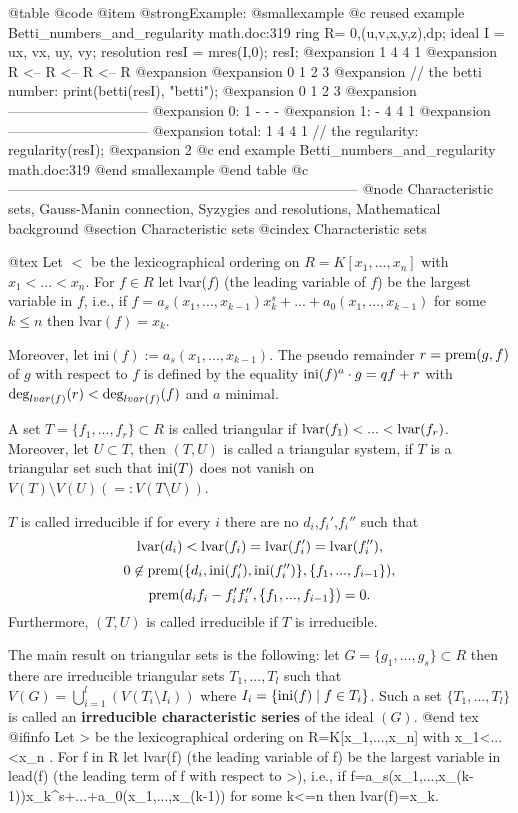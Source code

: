 @table @code
@item @strong{Example:}
@smallexample
@c reused example Betti_numbers_and_regularity math.doc:319 
  ring R= 0,(u,v,x,y,z),dp;
  ideal I = ux, vx, uy, vy;
  resolution resI = mres(I,0); resI;
@expansion{}  1      4      4      1      
@expansion{} R <--  R <--  R <--  R
@expansion{} 
@expansion{} 0      1      2      3      
@expansion{} 
  // the betti number:
  print(betti(resI), "betti");
@expansion{}            0     1     2     3
@expansion{} ------------------------------
@expansion{}     0:     1     -     -     -
@expansion{}     1:     -     4     4     1
@expansion{} ------------------------------
@expansion{} total:     1     4     4     1
  // the regularity:
  regularity(resI);
@expansion{} 2
@c end example Betti_numbers_and_regularity math.doc:319
@end smallexample
@end table
@c ---------------------------------------------------------------------------
@node Characteristic sets, Gauss-Manin connection, Syzygies and resolutions, Mathematical background
@section Characteristic sets
@cindex Characteristic sets

@tex
Let $<$ be the lexicographical ordering on $R=K[x_1,...,x_n]$ with $x_1
< ... < x_n$.
For $f \in R$ let lvar($f$) (the leading variable of $f$) be the largest
variable in $f$,
i.e., if $f=a_s(x_1,...,x_{k-1})x_k^s+...+a_0(x_1,...,x_{k-1})$ for some
$k \leq n$ then lvar$(f)=x_k$.

Moreover, let
\hbox{ini}$(f):=a_s(x_1,...,x_{k-1})$. The pseudo remainder
$r=\hbox{prem}(g,f)$ of $g$ with respect to $f$ is
defined by the equality $\hbox{ini}(f)^a\cdot g = qf+r$ with
$\hbox{deg}_{lvar(f)}(r)<\hbox{deg}_{lvar(f)}(f)$ and $a$
minimal.

A set $T=\{f_1,...,f_r\} \subset R$ is called triangular if
$\hbox{lvar}(f_1)<...<\hbox{lvar}(f_r)$. Moreover, let $ U \subset T $,
then $(T,U)$ is called a triangular system, if $T$ is a triangular set
such that $\hbox{ini}(T)$ does not vanish on $V(T) \setminus V(U)
(=:V(T\setminus U))$.

$T$ is called irreducible if for every $i$ there are no
$d_i$,$f_i'$,$f_i''$ such that
$$   \hbox{lvar}(d_i)<\hbox{lvar}(f_i) =
\hbox{lvar}(f_i')=\hbox{lvar}(f_i''),$$
$$   0 \not\in \hbox{prem}(\{ d_i, \hbox{ini}(f_i'),
\hbox{ini}(f_i'')\},\{ f_1,...,f_{i-1}\}),$$
$$\hbox{prem}(d_if_i-f_i'f_i'',\{f_1,...,f_{i-1}\})=0.$$
Furthermore, $(T,U)$ is called irreducible if $T$ is irreducible.

The main result on triangular sets is the following:
let $G=\{g_1,...,g_s\} \subset R$ then there are irreducible triangular sets $T_1,...,T_l$
such that $V(G)=\bigcup_{i=1}^{l}(V(T_i\setminus I_i))$
where $I_i=\{\hbox{ini}(f) \mid f \in T_i \}$. Such a set
$\{T_1,...,T_l\}$ is called an {\bf irreducible characteristic series} of
the ideal $(G)$.
@end tex
@ifinfo
Let > be the lexicographical ordering on R=K[x_1,...,x_n] with x_1<...<x_n .
For f in R let lvar(f) (the leading variable of f) be the largest
variable in lead(f) (the leading term of f with respect to >),
i.e., if f=a_s(x_1,...,x_(k-1))x_k^s+...+a_0(x_1,...,x_(k-1)) for some
k<=n then lvar(f)=x_k.

